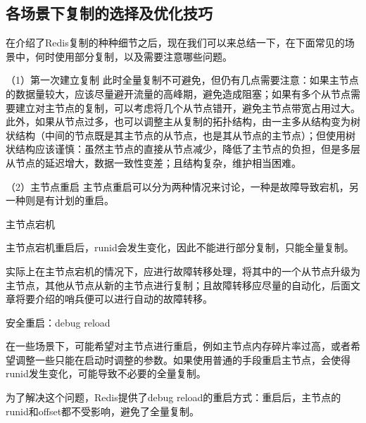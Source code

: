 \documentclass[../../../interview-questions.tex]{subfiles}
\begin{document}
\subsection{各场景下复制的选择及优化技巧}

在介绍了Redis复制的种种细节之后，现在我们可以来总结一下，在下面常见的场景中，何时使用部分复制，以及需要注意哪些问题。

（1）第一次建立复制
此时全量复制不可避免，但仍有几点需要注意：如果主节点的数据量较大，应该尽量避开流量的高峰期，避免造成阻塞；如果有多个从节点需要建立对主节点的复制，可以考虑将几个从节点错开，避免主节点带宽占用过大。此外，如果从节点过多，也可以调整主从复制的拓扑结构，由一主多从结构变为树状结构（中间的节点既是其主节点的从节点，也是其从节点的主节点）；但使用树状结构应该谨慎：虽然主节点的直接从节点减少，降低了主节点的负担，但是多层从节点的延迟增大，数据一致性变差；且结构复杂，维护相当困难。

（2）主节点重启
主节点重启可以分为两种情况来讨论，一种是故障导致宕机，另一种则是有计划的重启。

主节点宕机

主节点宕机重启后，runid会发生变化，因此不能进行部分复制，只能全量复制。

实际上在主节点宕机的情况下，应进行故障转移处理，将其中的一个从节点升级为主节点，其他从节点从新的主节点进行复制；且故障转移应尽量的自动化，后面文章将要介绍的哨兵便可以进行自动的故障转移。

安全重启：debug reload

在一些场景下，可能希望对主节点进行重启，例如主节点内存碎片率过高，或者希望调整一些只能在启动时调整的参数。如果使用普通的手段重启主节点，会使得runid发生变化，可能导致不必要的全量复制。

为了解决这个问题，Redis提供了debug reload的重启方式：重启后，主节点的runid和offset都不受影响，避免了全量复制。
\end{document}
